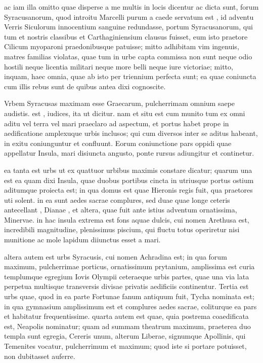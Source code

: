  ac iam illa omitto quae disperse a me multis in locis dicentur ac dicta sunt, forum Syracusanorum, quod introitu Marcelli purum a caede servatum est , id adventu Verris Siculorum innocentium sanguine redundasse, portum Syracusanorum, qui tum et nostris classibus et Carthaginiensium clausus fuisset, eum isto praetore Cilicum myoparoni praedonibusque patuisse; mitto adhibitam vim ingenuis, matres familias violatas, quae tum in urbe capta commissa non sunt neque odio hostili neque licentia militari neque more belli neque iure victoriae; mitto, inquam, haec omnia, quae ab isto per triennium perfecta sunt; ea quae coniuncta cum illis rebus sunt de quibus antea dixi cognoscite.

 Vrbem Syracusas maximam esse Graecarum, pulcherrimam omnium saepe audistis. est , iudices, ita ut dicitur. nam et situ est cum munito tum ex omni aditu vel terra vel mari praeclaro ad aspectum, et portus habet prope in aedificatione amplexuque urbis inclusos; qui cum diversos inter se aditus habeant, in exitu coniunguntur et confluunt. Eorum coniunctione pars oppidi quae appellatur Insula, mari disiuncta angusto, ponte rursus adiungitur et continetur.

 ea tanta est urbs ut ex quattuor urbibus maximis constare dicatur; quarum una est ea quam dixi Insula, quae duobus portibus cincta in utriusque portus ostium aditumque proiecta est; in qua domus est quae Hieronis regis fuit, qua praetores uti solent. in ea sunt aedes sacrae complures, sed duae quae longe ceteris antecellant , Dianae , et altera, quae fuit ante istius adventum ornatissima, Minervae. in hac insula extrema est fons aquae dulcis, cui nomen Arethusa est, incredibili magnitudine, plenissimus piscium, qui fluctu totus operiretur nisi munitione ac mole lapidum diiunctus esset a mari.

 altera autem est urbs Syracusis, cui nomen Achradina est; in qua forum maximum, pulcherrimae porticus, ornatissimum prytanium, amplissima est curia templumque egregium Iovis Olympii ceteraeque urbis partes, quae una via lata perpetua multisque transversis divisae privatis aedificiis continentur. Tertia est urbs quae, quod in ea parte Fortunae fanum antiquum fuit, Tycha nominata est; in qua gymnasium amplissimum est et complures aedes sacrae, coliturque ea pars et habitatur frequentissime. quarta autem est quae, quia postrema coaedificata est, Neapolis nominatur; quam ad summam theatrum maximum, praeterea duo templa sunt egregia, Cereris unum, alterum Liberae, signumque Apollinis, qui Temenites vocatur, pulcherrimum et maximum; quod iste si portare potuisset, non dubitasset auferre.

